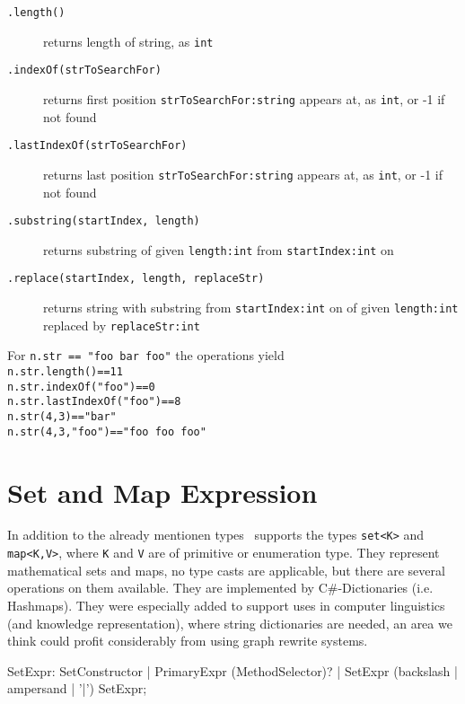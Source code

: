 \begin{description}
\item[\texttt{.length()}] returns length of string, as \texttt{int}
\item[\texttt{.indexOf(strToSearchFor)}] returns first position \texttt{strToSearchFor:string} appears at, as \texttt{int}, or -1 if not found
\item[\texttt{.lastIndexOf(strToSearchFor)}] returns last position \texttt{strToSearchFor:string} appears at, as \texttt{int}, or -1 if not found
\item[\texttt{.substring(startIndex, length)}] returns substring of given \texttt{length:int} from \texttt{startIndex:int} on
\item[\texttt{.replace(startIndex, length, replaceStr)}] returns string with substring from \texttt{startIndex:int} on of given \texttt{length:int} replaced by \texttt{replaceStr:int}
\end{description}

\begin{example}
For \texttt{n.str == "foo bar foo"} the operations yield \\
\texttt{n.str.length()==11} \\
\texttt{n.str.indexOf("foo")==0} \\
\texttt{n.str.lastIndexOf("foo")==8} \\
\texttt{n.str(4,3)=="bar"} \\
\texttt{n.str(4,3,"foo")=="foo foo foo"} \\
\end{example}

\section{Set and Map Expression}

In addition to the already mentionen types \GrG~supports the types \texttt{set<K>} and \texttt{map<K,V>}, where \texttt{K} and \texttt{V} are of primitive or enumeration type.
They represent mathematical sets and maps, no type casts are applicable, but there are several operations on them available. They are implemented by C\#-Dictionaries (i.e. Hashmaps).
They were especially added to support uses in computer linguistics (and knowledge representation), where string dictionaries are needed, an area we think could profit considerably from using graph rewrite systems.

\begin{rail} 
  SetExpr: SetConstructor | PrimaryExpr (MethodSelector)? | SetExpr (backslash | ampersand | '|') SetExpr;
\end{rail}

